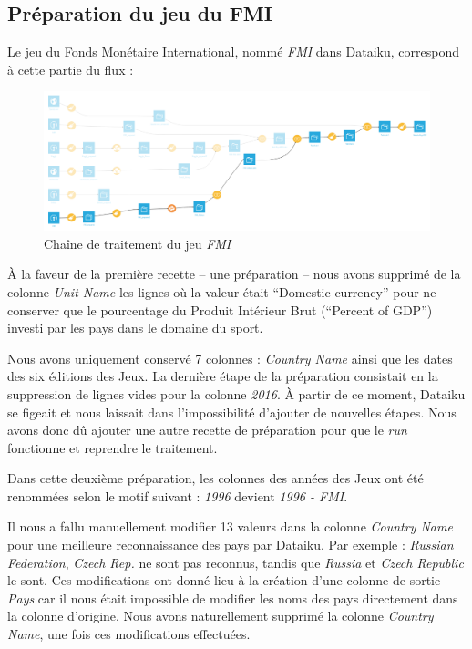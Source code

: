 \documentclass[hidelinks, 12pt]{report}
\begin{document}
\subsection{Préparation du jeu du FMI}

Le jeu du Fonds Monétaire International, nommé \textit{FMI} dans Dataiku, correspond à cette partie du flux :

\begin{center}
	\begin{figure}[H]
		\setlength{\belowcaptionskip}{-35pt}
		\includegraphics[scale=0.35]{images/flow-medals-fmi.png}
		\caption{Chaîne de traitement du jeu \textit{FMI}}
	\end{figure}
\end{center}

À la faveur de la première recette -- une préparation -- nous avons supprimé de la colonne \textit{Unit Name} les lignes où la valeur était \enquote{Domestic currency} pour ne conserver que le pourcentage du Produit Intérieur Brut (\enquote{Percent of GDP}) investi par les pays dans le domaine du sport.

Nous avons uniquement conservé 7 colonnes : \textit{Country Name} ainsi que les dates des six éditions des Jeux. La dernière étape de la préparation consistait en la suppression de lignes vides pour la colonne \textit{2016}. À partir de ce moment, Dataiku se figeait et nous laissait dans l'impossibilité d'ajouter de nouvelles étapes. Nous avons donc dû ajouter une autre recette de préparation pour que le \textit{run} fonctionne et reprendre le traitement.

Dans cette deuxième préparation, les colonnes des années des Jeux ont été renommées selon le motif suivant : \textit{1996} devient \textit{1996 - FMI}.

Il nous a fallu manuellement modifier 13 valeurs dans la colonne \emph{Country Name} pour une meilleure reconnaissance des pays par Dataiku. Par exemple : \emph{Russian Federation}, \emph{Czech Rep.} ne sont pas reconnus, tandis que \emph{Russia} et \emph{Czech Republic} le sont. Ces modifications ont donné lieu à la création d'une colonne de sortie \emph{Pays} car il nous était impossible de modifier les noms des pays directement dans la colonne d'origine. Nous avons naturellement supprimé la colonne \emph{Country Name}, une fois ces modifications effectuées. 
\end{document}
